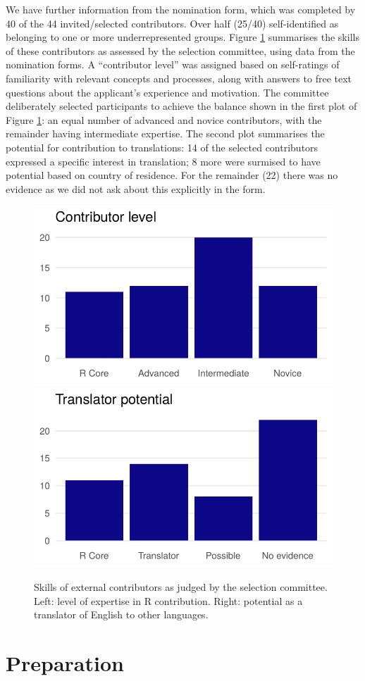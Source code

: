 We have further information from the nomination form, which was completed by 40 of the 44 invited/selected contributors. Over half (25/40) self-identified as belonging to one or more underrepresented groups. Figure \ref{fig:skills} summarises the skills of these contributors as assessed by the selection committee, using data from the nomination forms. A ``contributor level'' was assigned based on self-ratings of familiarity with relevant concepts and processes, along with answers to free text questions about the applicant's experience and motivation.
The committee deliberately selected participants to achieve the balance shown in
the first plot of Figure \ref{fig:skills}: an equal number of advanced and
novice contributors, with the remainder having intermediate expertise. The second
plot summarises the potential for contribution to translations: 14 of
the selected contributors expressed a specific interest in translation; 8 more
were surmised to have potential based on country of residence. For the
remainder (22) there was no evidence as we did not ask about this explicitly in the form.

\begin{figure}
\includegraphics[width=0.5\linewidth]{figures/contributor_level} \includegraphics[width=0.5\linewidth]{figures/translator_level} \caption{Skills of external contributors as judged by the selection committee. Left: level of expertise in R contribution. Right: potential as a translator of English to other languages.}\label{fig:skills}
\end{figure}

\hypertarget{preparation}{%
\section{Preparation}\label{preparation}}

